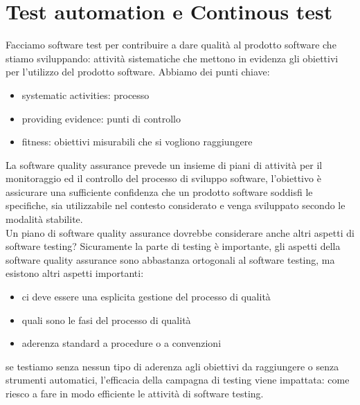 \documentclass{article}
\begin{document}
\section{Test automation e Continous test}
Facciamo software test per contribuire a dare qualità al prodotto software che stiamo sviluppando: attività sistematiche che mettono in evidenza gli obiettivi per l'utilizzo del prodotto software. Abbiamo dei punti chiave:
\begin{itemize}
\item systematic activities: processo 
\item providing evidence: punti di controllo
\item fitness: obiettivi misurabili che si vogliono raggiungere
\end{itemize}
La software quality assurance prevede un insieme di piani di attività per il monitoraggio ed il controllo del processo di sviluppo software, l'obiettivo è assicurare una sufficiente confidenza che un prodotto software soddisfi le specifiche, sia utilizzabile nel contesto considerato e venga sviluppato secondo le modalità stabilite.\\ Un piano di software quality assurance dovrebbe considerare anche altri aspetti di software testing? Sicuramente la parte di testing è importante, gli aspetti della software quality assurance sono abbastanza ortogonali al software testing, ma esistono altri aspetti importanti:
\begin{itemize}
\item ci deve essere una esplicita gestione del processo di qualità
\item quali sono le fasi del processo di qualità
\item aderenza standard a procedure o a convenzioni
\end{itemize}
se testiamo senza nessun tipo di aderenza agli obiettivi da raggiungere o senza strumenti automatici, l'efficacia della campagna di testing viene impattata: come riesco a fare in modo efficiente le attività di software testing.
\end{document}
